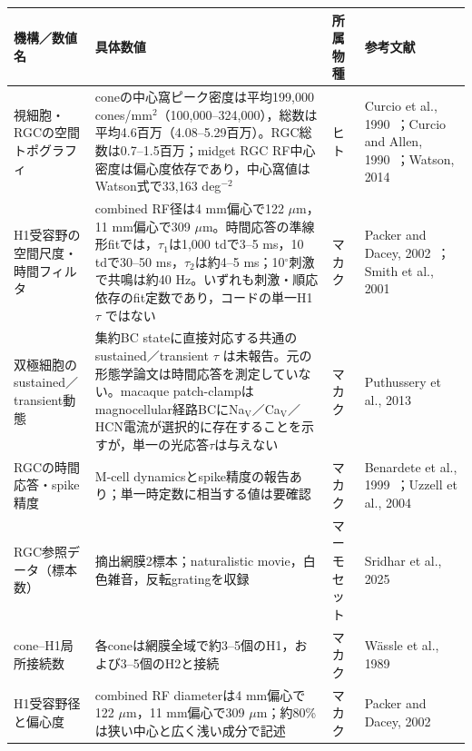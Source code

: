 \documentclass[uplatex,dvipdfmx,a4paper,10pt]{jsarticle}
\begin{document}
\begingroup
\centering
\fontsize{7.3}{8.7}\selectfont
\setlength{\tabcolsep}{2.5pt}
\renewcommand{\arraystretch}{1.15}
\begin{tabular}{>{\raggedright\arraybackslash}p{3.10cm}
                >{\raggedright\arraybackslash}p{7.25cm}
                >{\centering\arraybackslash}p{1.35cm}
                >{\raggedright\arraybackslash}p{4.30cm}}
\toprule
機構／数値名 & 具体数値 & 所属物種 & 参考文献 \\
\midrule
視細胞・RGCの空間トポグラフィ
& coneの中心窩ピーク密度は平均199,000 cones/mm$^2$（100,000--324,000），総数は平均4.6百万（4.08--5.29百万）。RGC総数は0.7--1.5百万；midget RGC RF中心密度は偏心度依存であり，中心窩値はWatson式で33,163 deg$^{-2}$
& ヒト
& Curcio et al., 1990~\cite{curcio1990}；Curcio and Allen, 1990~\cite{curcioallen1990}；Watson, 2014~\cite{watson2014} \\

H1受容野の空間尺度・時間フィルタ
& combined RF径は4 mm偏心で122 $\mu$m，11 mm偏心で309 $\mu$m。時間応答の準線形fitでは，$\tau_1$は1,000 tdで3--5 ms，10 tdで30--50 ms，$\tau_2$は約4--5 ms；10$^\circ$刺激で共鳴は約40 Hz。いずれも刺激・順応依存のfit定数であり，コードの単一H1 $\tau$ ではない
& マカク
& Packer and Dacey, 2002~\cite{packer2002}；Smith et al., 2001~\cite{smith2001} \\

双極細胞のsustained／transient動態
& 集約BC stateに直接対応する共通のsustained／transient $\tau$ は未報告。元の形態学論文は時間応答を測定していない。macaque patch-clampはmagnocellular経路BCにNa$_\mathrm{V}$／Ca$_\mathrm{V}$／HCN電流が選択的に存在することを示すが，単一の光応答$\tau$は与えない
& マカク
& Puthussery et al., 2013~\cite{puthussery2013} \\

RGCの時間応答・spike精度
& M-cell dynamicsとspike精度の報告あり；単一時定数に相当する値は要確認
& マカク
& Benardete et al., 1999~\cite{benardete1999}；Uzzell et al., 2004~\cite{uzzell2004} \\

RGC参照データ（標本数）
& 摘出網膜2標本；naturalistic movie，白色雑音，反転gratingを収録
& マーモセット
& Sridhar et al., 2025~\cite{sridhar2025} \\

cone--H1局所接続数
& 各coneは網膜全域で約3--5個のH1，および3--5個のH2と接続
& マカク
& Wässle et al., 1989~\cite{wassle1989} \\

H1受容野径と偏心度
& combined RF diameterは4 mm偏心で122 $\mu$m，11 mm偏心で309 $\mu$m；約80\%は狭い中心と広く浅い成分で記述
& マカク
& Packer and Dacey, 2002~\cite{packer2002} \\


\end{tabular}
\end{document}
